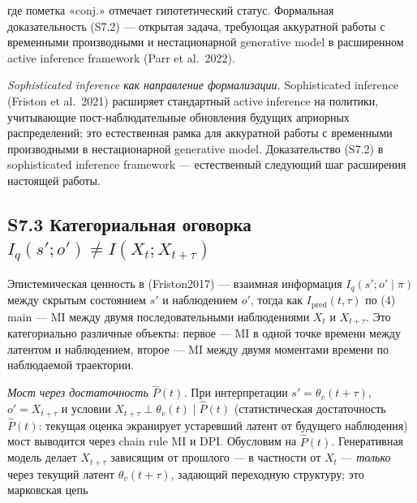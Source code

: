 \documentclass[pdflatex,sn-mathphys-ay]{sn-jnl}
\begin{document}
где пометка «conj.» отмечает гипотетический статус. Формальная доказательность (S7.2) --- открытая задача, требующая аккуратной работы с временными производными и нестационарной generative model в расширенном active inference framework (Parr et al.~2022).



\emph{Sophisticated inference как направление формализации.} Sophisticated inference (Friston et al.~2021) расширяет стандартный active inference на политики, учитывающие пост-наблюдательные обновления будущих априорных распределений; это естественная рамка для аккуратной работы с временными производными в нестационарной generative model. Доказательство (S7.2) в sophisticated inference framework --- естественный следующий шаг расширения настоящей работы.



\subsection*{\texorpdfstring{S7.3 Категориальная оговорка \(I_q(s'; o') \ne I(X_t; X_{t+\tau})\)}{S7.3 Категориальная оговорка I\_q(s\textquotesingle; o\textquotesingle) \textbackslash ne I(X\_t; X\_\{t+\textbackslash tau\})}}\label{s7.3-ux43aux430ux442ux435ux433ux43eux440ux438ux430ux43bux44cux43dux430ux44f-ux43eux433ux43eux432ux43eux440ux43aux430-i_qs-o-ne-ix_t-x_ttau}



Эпистемическая ценность в (Friston2017) --- взаимная информация \(I_q(s'; o'\mid\pi)\) между скрытым состоянием \(s'\) и наблюдением \(o'\), тогда как \(I_{\text{pred}}(t,\tau)\) по (4) main --- MI между двумя последовательными наблюдениями \(X_t\) и \(X_{t+\tau}\). Это категориально различные объекты: первое --- MI в одной точке времени между латентом и наблюдением, второе --- MI между двумя моментами времени по наблюдаемой траектории.



\emph{Мост через достаточность \(\hat P(t)\).} При интерпретации \(s' = \theta_v(t+\tau)\), \(o' = X_{t+\tau}\) и условии \(X_{t+\tau} \perp \theta_v(t) \mid \hat P(t)\) (статистическая достаточность \(\hat P(t)\): текущая оценка экранирует устаревший латент от будущего наблюдения) мост выводится через chain rule MI и DPI. Обусловим на \(\hat P(t)\). Генеративная модель делает \(X_{t+\tau}\) зависящим от прошлого --- в частности от \(X_t\) --- \emph{только} через текущий латент \(\theta_v(t+\tau)\), задающий переходную структуру; это марковская цепь
\end{document}
